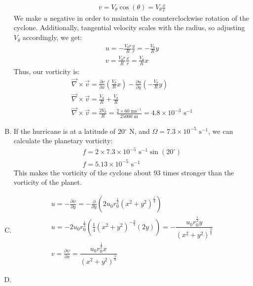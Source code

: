 \documentclass[11pt,a4paper,margin=1in]{article}
\begin{document}
\begin{enumerate}[A.]
\begin{gather*}
        v = V_\theta \cos(\theta) = V_\theta \frac{x}{r}
    \end{gather*}
    We make $u$ negative in order to maintain the counterclockwise rotation of 
    the cyclone. Additionally, tangential velocity scales with the radius, so 
    adjusting $V_\theta$ accordingly, we get:
    \begin{gather*}
        u = -\frac{V_\theta r}{R} \frac{y}{r} = -\frac{V_\theta}{R} y \\
        v = \frac{V_\theta r}{R} \frac{x}{r} = \frac{V_\theta}{R} x
    \end{gather*}
    Thus, our vorticity is:
    \begin{gather*}
        \vec{\nabla} \times \vec{v} = \frac{\partial v}{\partial x}\left(
            \frac{V_\theta}{R}x\right) - \frac{\partial u}{\partial y}\left(
            -\frac{V_\theta}{R}y\right) \\
        \vec{\nabla} \times \vec{v} = \frac{V_\theta}{R} + \frac{V_\theta}{R} \\
        \vec{\nabla} \times \vec{v} = \frac{2V_\theta}{R} = \frac{2 \times 60 
            \text{ ms}^{-1}}{25000 \text{ m}} = 4.8 \times 10^{-3} \text{ s}^{-1} 
    \end{gather*}
    \item 
    If the hurricane is at a latitude of 20$^\circ$ N, and $\Omega = 7.3 \times
    10^{-5} \text{ s}^{-1}$, we can calculate the planetary vorticity:
    \begin{gather*}
        f = 2 \times 7.3 \times 10^{-5} \text{ s}^{-1} \sin(20^\circ) \\
        f = 5.13 \times 10^{-5} \text{ s}^{-1}
    \end{gather*}
    This makes the vorticity of the cyclone about 93 times stronger than the
    vorticity of the planet.
    \item 
    \begin{gather*}
        u = -\frac{\partial \psi}{\partial y} = -\frac{\partial}{\partial y} 
            \left(2u_0r_0^{\frac{1}{2}}(x^2 + y^2)^{\frac{1}{4}}\right)\\
        u = -2u_0r_0^{\frac{1}{2}}\left(\frac{1}{4}(x^2 + y^2)^{-\frac{3}{4}}(2y)
            \right) = -\dfrac{u_0r_0^{\frac{1}{2}}y}{(x^2 + y^2)^{\frac{3}{4}}}\\
        v = \frac{\partial \psi}{\partial x} = \dfrac{u_0r_0^{\frac{1}{2}}x}
            {(x^2 + y^2)^{\frac{3}{4}}}
    \end{gather*}
    \item 

\end{enumerate}
\end{document}
